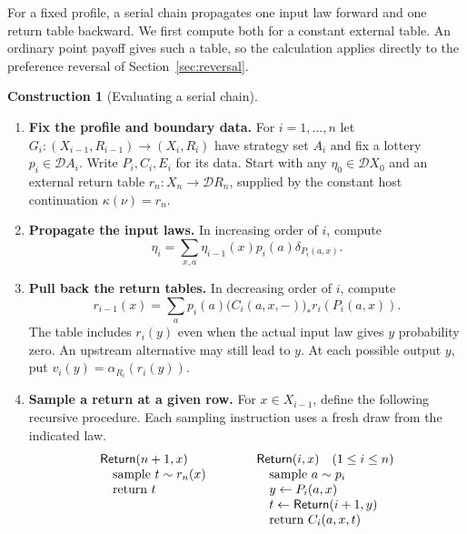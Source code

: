 \documentclass[11pt,a4paper]{article}
\theoremstyle{definition}
\newtheorem*{construction}{Construction}
\newcommand{\D}{\mathcal D}
\begin{document}
For a fixed profile, a serial chain propagates one input law forward and one return table backward. We first compute both for a constant external table. An ordinary point payoff gives such a table, so the calculation applies directly to the preference reversal of Section~\ref{sec:reversal}.

\begin{construction}[Evaluating a serial chain]\leavevmode
    \begin{enumerate}[titledsteps]
        \item \textbf{Fix the profile and boundary data.} For $i=1,\ldots,n$ let $G_i:(X_{i-1},R_{i-1})\to(X_i,R_i)$ have strategy set $A_i$ and fix a lottery $p_i\in\D A_i$. Write $P_i,C_i,E_i$ for its data. Start with any $\eta_0\in\D X_0$ and an external return table $r_n:X_n\to\D R_n$, supplied by the constant host continuation $\kappa(\nu)=r_n$.

        \item \textbf{Propagate the input laws.} In increasing order of $i$, compute
        \begin{equation}
            \eta_i=\sum_{x,a}\eta_{i-1}(x)p_i(a)\delta_{P_i(a,x)}.
            \label{eq:fwchain}
        \end{equation}

        \item \textbf{Pull back the return tables.} In decreasing order of $i$, compute
        \begin{equation}
            r_{i-1}(x)=\sum_a p_i(a)\big(C_i(a,x,-)\big)_*r_i(P_i(a,x)).
            \label{eq:bwchain}
        \end{equation}
        The table includes $r_i(y)$ even when the actual input law gives $y$ probability zero. An upstream alternative may still lead to $y$. At each possible output $y$, put $v_i(y)=\alpha_{R_i}(r_i(y))$.

        \item \textbf{Sample a return at a given row.} For $x\in X_{i-1}$, define the following recursive procedure. Each sampling instruction uses a fresh draw from the indicated law.
        \[
            \begin{array}[t]{@{}l@{}}
                \mathsf{Return}(n+1,x)\\
                \quad\text{sample }t\sim r_n(x)\\
                \quad\text{return }t
            \end{array}
            \qquad\qquad
            \begin{array}[t]{@{}l@{}}
                \mathsf{Return}(i,x)\quad(1\le i\le n)\\
                \quad\text{sample }a\sim p_i\\
                \quad y\gets P_i(a,x)\\
                \quad t\gets\mathsf{Return}(i+1,y)\\
                \quad\text{return }C_i(a,x,t)
            \end{array}
        \]
    \end{enumerate}
\end{construction}
\end{document}
